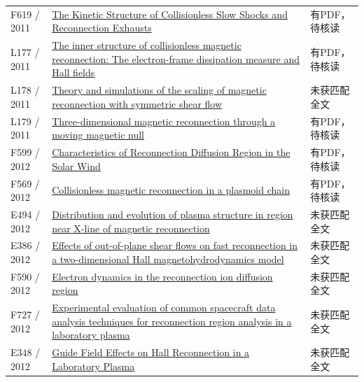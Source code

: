 \begin{longtable}{P{24mm}P{97mm}P{27mm}}
F619 / 2011 & \href{http://hdl.handle.net/1903/11865}{The Kinetic Structure of Collisionless Slow Shocks and Reconnection Exhausts} & 有PDF，待核读\\

L177 / 2011 & \href{https://doi.org/10.1063/1.3662430}{The inner structure of collisionless magnetic reconnection: The electron-frame dissipation measure and Hall fields} & 有PDF，待核读\\

L178 / 2011 & \href{https://doi.org/10.1063/1.3602859}{Theory and simulations of the scaling of magnetic reconnection with symmetric shear flow} & 未获匹配全文\\

L179 / 2011 & \href{https://doi.org/10.5194/npg-18-871-2011}{Three-dimensional magnetic reconnection through a moving magnetic null} & 有PDF，待核读\\

F599 / 2012 & \href{https://doi.org/10.11728/cjss2012.06.778}{Characteristics of Reconnection Diffusion Region in the Solar Wind} & 有PDF，待核读\\

F569 / 2012 & \href{https://doi.org/10.5194/npg-19-145-2012}{Collisionless magnetic reconnection in a plasmoid chain} & 有PDF，待核读\\

E494 / 2012 & \href{http://en.cnki.com.cn/Article_en/CJFDTOTAL-NCDL201203012.htm}{Distribution and evolution of plasma structure in region near X-line of magnetic reconnection} & 未获匹配全文\\

E386 / 2012 & \href{https://doi.org/10.1063/1.3697561}{Effects of out-of-plane shear flows on fast reconnection in a two-dimensional Hall magnetohydrodynamics model} & 未获匹配全文\\

F590 / 2012 & \href{https://doi.org/10.1029/2012ja017896}{Electron dynamics in the reconnection ion diffusion region} & 未获匹配全文\\

F727 / 2012 & \href{https://doi.org/10.1029/2012ja017742}{Experimental evaluation of common spacecraft data analysis techniques for reconnection region analysis in a laboratory plasma} & 未获匹配全文\\

E348 / 2012 & \href{http://absimage.aps.org/image/DPP12/MWS_DPP12-2012-000125.pdf}{Guide Field Effects on Hall Reconnection in a Laboratory Plasma} & 未获匹配全文\\


\end{longtable}
